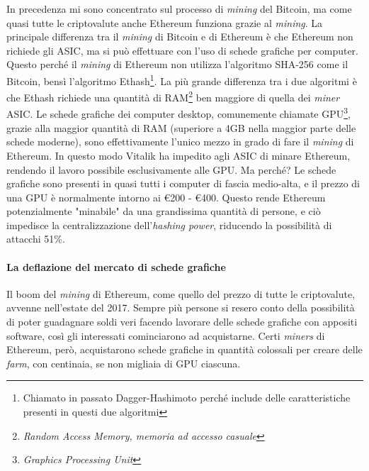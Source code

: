 \documentclass {article}
\begin{document}
In precedenza mi sono concentrato sul processo di \textit{mining} del Bitcoin, ma come quasi tutte le criptovalute anche Ethereum funziona grazie al \textit{mining}.
La principale differenza tra il \textit{mining} di Bitcoin e di Ethereum è che Ethereum non richiede gli ASIC, ma si può effettuare con l'uso di schede grafiche per computer.
Questo perché il \textit{mining} di Ethereum non utilizza l'algoritmo SHA-256 come il Bitcoin, bensì l'algoritmo Ethash\footnote{Chiamato in passato Dagger-Hashimoto perché include delle caratteristiche presenti in questi due algoritmi}.
La più grande differenza tra i due algoritmi è che Ethash richiede una quantità di RAM\footnote{\textit{Random Access Memory, memoria ad accesso casuale}} ben maggiore di quella dei \textit{miner} ASIC.
Le schede grafiche dei computer desktop, comunemente chiamate GPU\footnote{\textit{Graphics Processing Unit}}, grazie alla maggior quantità di RAM (superiore a 4GB nella maggior parte delle schede moderne), sono effettivamente l'unico mezzo in grado di fare il \textit{mining} di Ethereum.
In questo modo Vitalik ha impedito agli ASIC di minare Ethereum, rendendo il lavoro possibile esclusivamente alle GPU. Ma perché?
Le schede grafiche sono presenti in quasi tutti i computer di fascia medio-alta, e il prezzo di una GPU è normalmente intorno ai \euro{200} - \euro{400}.
Questo rende Ethereum potenzialmente "minabile" da una grandissima quantità di persone, e ciò impedisce la centralizzazione dell'\textit{hashing power}, riducendo la possibilità di attacchi 51\%.

\paragraph {La deflazione del mercato di schede grafiche}

Il boom del \textit{mining} di Ethereum, come quello del prezzo di tutte le criptovalute, avvenne nell'estate del 2017.
Sempre più persone si resero conto della possibilità di poter guadagnare soldi veri facendo lavorare delle schede grafiche con appositi software, così gli interessati cominciarono ad acquistarne.
Certi \textit{miners} di Ethereum, però, acquistarono schede grafiche in quantità colossali per creare delle \textit{farm}, con centinaia, se non migliaia di GPU ciascuna.
\end{document}
